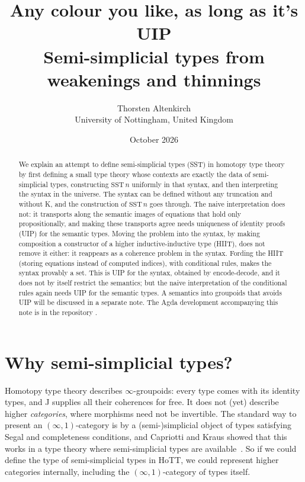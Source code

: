 \documentclass[11pt]{article}
\title{Any colour you like, as long as it's UIP\\[0.5ex]
\large Semi-simplicial types from weakenings and thinnings}
\author{Thorsten Altenkirch\\[0.5ex]
\small University of Nottingham, United Kingdom\\
\small\href{mailto:Thorsten.Altenkirch@nottingham.ac.uk}{\ag{Thorsten.Altenkirch@nottingham.ac.uk}}}
\date{October 2026}
\newcommand{\ag}[1]{\texttt{\detokenize{#1}}}
\newcommand{\repourl}{https://github.com/txa/sst-new}
\begin{document}
\maketitle

\begin{abstract}
We explain an attempt to define semi-simplicial types (SST) in homotopy type
theory by first defining a small type theory whose contexts are exactly the
data of semi-simplicial types, constructing $\mathrm{SST}\,n$ uniformly in that
syntax, and then interpreting the syntax in the universe. The syntax can be
defined without any truncation and without K, and the construction of
$\mathrm{SST}\,n$ goes through. The naive interpretation does not: it
transports along the semantic images of equations that hold only
propositionally, and making these transports agree needs uniqueness of
identity proofs (UIP) for the semantic types. Moving the problem into the
syntax, by making composition a constructor of a higher inductive-inductive
type (HIIT), does not remove it either: it
reappears as a coherence problem in the syntax. Fording the HIIT (storing
equations instead of computed indices), with conditional rules, makes the
syntax provably a set. This is UIP for the
syntax, obtained by encode-decode, and it does not by itself restrict the
semantics; but the naive interpretation of the conditional rules again needs
UIP for the semantic types. A semantics into groupoids that avoids UIP will be
discussed in a separate note. The Agda development accompanying this note is in the repository
\href{\repourl}{\ag{github.com/txa/sst-new}}.
\end{abstract}

\section{Why semi-simplicial types?}

Homotopy type theory describes $\infty$-groupoids: every type comes with its
identity types, and J supplies all their coherences for free. It does not
(yet) describe higher \emph{categories}, where morphisms need not be
invertible. The standard way to present an $(\infty,1)$-category is by a
(semi-)simplicial object of types satisfying Segal and completeness
conditions, and Capriotti and Kraus showed that this works in a type theory
where semi-simplicial types are available~\cite{capriotti-kraus}. So if we
could define the type of semi-simplicial types in HoTT, we could represent
higher categories internally, including the $(\infty,1)$-category of types
itself.
\end{document}
